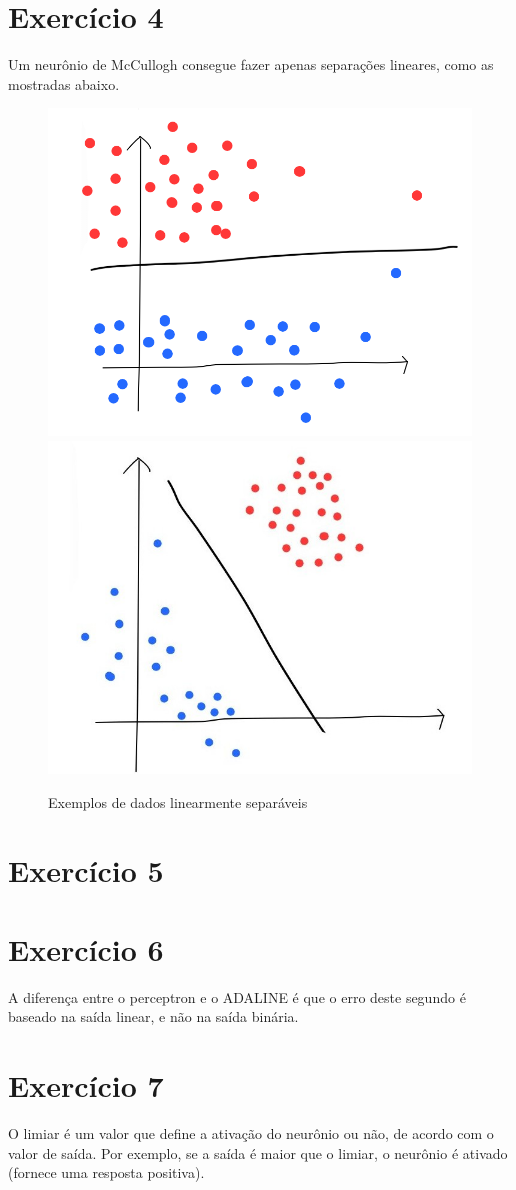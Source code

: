 \documentclass[a4]{article}
\begin{document}
\section*{Exercício 4}

Um neurônio de McCullogh consegue fazer apenas separações lineares, como as mostradas abaixo.

\begin{figure}[H]
	\centering
	\includegraphics[width=0.45\linewidth]{esquema1}
	\includegraphics[width=0.45\linewidth]{esquema2}
	\caption{Exemplos de dados linearmente separáveis}
\end{figure}

\section*{Exercício 5}
 
\section*{Exercício 6}

A diferença entre o perceptron e o ADALINE é que o erro deste segundo é baseado na saída linear, e não na saída binária.

\section*{Exercício 7}

O limiar é um valor que define a ativação do neurônio ou não, de acordo com o valor de saída. Por exemplo, se a saída é maior que o limiar, o neurônio é ativado (fornece uma resposta positiva).
\end{document}
